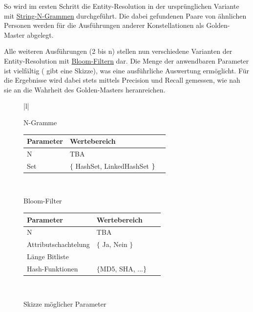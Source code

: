 So wird im ersten Schritt die Entity-Resolution in der ursprünglichen Variante mit \hyperref[sec:approaches:n-gramm]{String-N-Grammen} durchgeführt.
Die dabei gefundenen Paare von ähnlichen Personen werden für die Ausführungen anderer Konstellationen als Golden-Master abgelegt.

Alle weiteren Ausführungen (2 bis n) stellen nun verschiedene Varianten der Entity-Resolution mit \hyperref[sec:approaches:bloom]{Bloom-Filtern} dar.
Die Menge der anwendbaren Parameter ist vielfältig ( gibt eine Skizze),
was eine ausführliche Auswertung ermöglicht.
Für die Ergebnisse wird dabei stets mittels Precision und Recall gemessen, wie nah sie an die Wahrheit des Golden-Masters heranreichen.

\begin{figure}
\begin{tabular}{|l|}
	\hline
	\begin{minipage}{0.46\textwidth}
		\vspace*{0.1cm}
		N-Gramme\\

		\hspace*{-0.4cm}
		\begin{footnotesize}
		\begin{tabular}{l|l}
				Parameter & Wertebereich\\
			\hline
			\hline
				N & TBA\\
			\hline
				Set & $\{$ HashSet, LinkedHashSet $\} \hspace*{0.34cm}$\\
		\end{tabular}
		\end{footnotesize}
	\end{minipage}\\
	\hline
	\hline
	\begin{minipage}{0.46\textwidth}
	\vspace*{0.1cm}
	Bloom-Filter\\

	\hspace*{-0.4cm}
	\begin{footnotesize}
		\begin{tabular}{l|l}
				Parameter & Wertebereich\\
			\hline
			\hline
				N & TBA\\
			\hline
				Attributschachtelung & $\{$ Ja, Nein $\}$\\
			\hline
				Länge Bitliste & \\
			\hline
				Hash-Funktionen & $\{$MD5, SHA, ...$\} \hspace*{0.53cm}$\\
		\end{tabular}
		\end{footnotesize}
	\end{minipage}\\
	\hline
\end{tabular}
\caption{Skizze möglicher Parameter}
\label{fig:parameters}
\end{figure}


